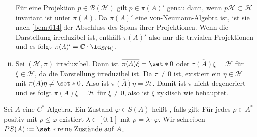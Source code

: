 \begin{beweis}
\begin{enumerate}[(i)]
		Für eine Projektion $p \in \mathcal{B}(\mathcal{H})$ gilt $p \in \pi(A)'$ genau dann, wenn $\overline{p \mathcal{H}} \subset \mathcal{H}$ invariant ist unter $\pi(A)$.
		Da $\pi(A)'$ eine von-Neumann-Algebra ist, ist sie nach \autoref{bem:614} der Abschluss des Spans ihrer Projektionen.
		Wenn die Darstellung irreduzibel ist, enthält $\pi(A)'$ also nur die trivialen Projektionen und es folgt $\pi(A)' = \mathbb{C} \cdot \id_{\mathcal{B}(\mathcal{H})}$.
		\item Sei $(\mathcal{H},\pi)$ irreduzibel.
		Dann ist $\overline{\pi(A)\xi}=\set*{0}$ oder $\overline{\pi(A)\xi}=\mathcal{H}$ für $\xi \in \mathcal{H}$, da die Darstellung irreduzibel ist.
		Da $\pi\neq 0$ ist, existiert ein $\eta \in \mathcal{H}$ mit $\pi(A)\eta \neq \set*{0}$.
		Also ist $\overline{\pi(A)\eta}=\mathcal{H}$.
		Damit ist $\pi$ nicht degeneriert und es folgt $\overline{\pi(A)\xi} = \mathcal{H}$ für $\xi\neq 0$, also ist $\xi$ zyklisch wie behauptet.\qedhere
	\end{enumerate}
\end{beweis}

\begin{definition}[{name=[reiner Zustand]}]
	Sei $A$ eine $C^*$-Algebra.
	Ein Zustand $\varphi \in S(A)$ heißt , falls gilt: Für jedes $\rho \in A^*$ positiv mit $\rho \le \varphi$ existiert $\lambda \in [0,1]$ mit $\rho= \lambda \cdot \varphi$.
	Wir schreiben $PS(A) := \set*{\text{reine Zustände auf }A}$.
\end{definition}

